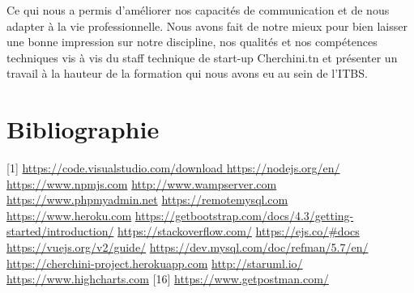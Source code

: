 Ce qui nous a permis d'am\'{e}liorer nos capacit\'{e}s de communication et de nous adapter \`{a} la vie professionnelle. Nous avons fait de notre mieux pour bien laisser une bonne impression sur notre discipline, nos qualit\'{e}s et nos comp\'{e}tences techniques vis \`{a} vis du staff technique de start-up Cherchini.tn et pr\'{e}senter un travail \`{a} la hauteur de la formation qui nous avons
eu au sein de l'ITBS.

\chapter*{Bibliographie}

[1]  \url{https://code.visualstudio.com/download } \newline
[2]  \url{https://nodejs.org/en/ }  \newline
[3]  \url{https://www.npmjs.com} \newline
[4]  \url{http://www.wampserver.com} \newline
[5]  \url{https://www.phpmyadmin.net}   \newline
[6]  \url{https://remotemysql.com}   \newline
[7]  \url{https://www.heroku.com}   \newline
[8]  \url{https://getbootstrap.com/docs/4.3/getting-started/introduction/}   \newline
[9]  \url{https://stackoverflow.com/}   \newline
[10] \url{https://ejs.co/#docs} \newline
[11] \url{https://vuejs.org/v2/guide/}  \newline
[12] \url{https://dev.mysql.com/doc/refman/5.7/en/}  \newline
[13] \url{https://cherchini-project.herokuapp.com}  \newline
[14] \url{http://staruml.io/}  \newline
[15] \url{https://www.highcharts.com}
[16] \url{https://www.getpostman.com/}
